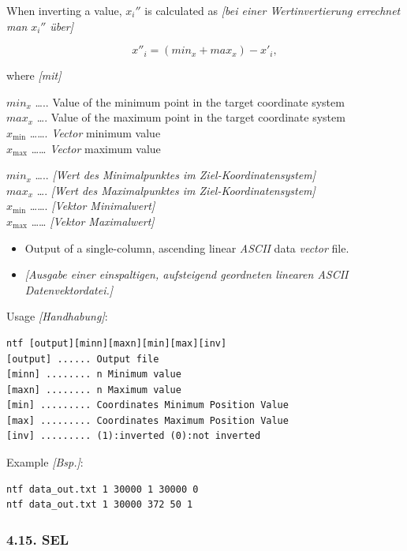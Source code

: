 \documentclass[
]{article}
\providecommand{\tightlist}{%
  \setlength{\itemsep}{0pt}\setlength{\parskip}{0pt}}
\begin{document}
When inverting a value, \(x_{i}''\) is calculated as \emph{{[}bei einer
Wertinvertierung errechnet man} \(x_{i}''\) \emph{über{]}}

\[x''_{i} = \left( min_{x} + max_{x} \right) - x'_{i},\]

where \emph{{[}mit{]}}

\(min_{x}\) \ldots.. Value of the minimum point in the target coordinate
system\\
\(max_{x}\) \ldots. Value of the maximum point in the target coordinate
system\\
\(x_{\min}\) \ldots\ldots. \emph{Vector} minimum value\\
\(x_{\max}\) \ldots\ldots{} \emph{Vector} maximum value

\(min_{x}\) \ldots.. \emph{{[}Wert des Minimalpunktes im
Ziel-Koordinatensystem{]}}\\
\(max_{x}\) \ldots. \emph{{[}Wert des Maximalpunktes im
Ziel-Koordinatensystem{]}}\\
\(x_{\min}\) \ldots\ldots. \emph{{[}Vektor Minimalwert{]}}\\
\(x_{\max}\) \ldots\ldots{} \emph{{[}Vektor Maximalwert{]}}

\begin{itemize}
\tightlist
\item
  Output of a single-column, ascending linear \emph{ASCII} data
  \emph{vector} file.
\item
  \emph{{[}Ausgabe einer einspaltigen, aufsteigend geordneten linearen
  ASCII Datenvektordatei.{]}}
\end{itemize}

Usage \emph{{[}Handhabung{]}}:

\begin{verbatim}
ntf [output][minn][maxn][min][max][inv] 
[output] ...... Output file
[minn] ........ n Minimum value 
[maxn] ........ n Maximum value 
[min] ......... Coordinates Minimum Position Value 
[max] ......... Coordinates Maximum Position Value 
[inv] ......... (1):inverted (0):not inverted
\end{verbatim}

Example \emph{{[}Bsp.{]}}:

\begin{verbatim}
ntf data_out.txt 1 30000 1 30000 0
ntf data_out.txt 1 30000 372 50 1
\end{verbatim}

\hypertarget{sel}{%
\subsubsection{4.15. SEL}\label{sel}}
\end{document}
